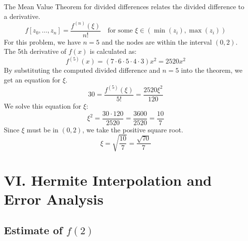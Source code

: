 \documentclass[a4paper]{article}
\begin{document}
The Mean Value Theorem for divided differences relates the divided difference to a derivative.
\[
f[z_0, \dots, z_n] = \frac{f^{(n)}(\xi)}{n!} \quad \text{for some } \xi \in (\min(z_i), \max(z_i))
\]
For this problem, we have $n=5$ and the nodes are within the interval $(0,2)$. The 5th derivative of $f(x)$ is calculated as:
\[
f^{(5)}(x) = (7 \cdot 6 \cdot 5 \cdot 4 \cdot 3) x^2 = 2520x^2
\]
By substituting the computed divided difference and $n=5$ into the theorem, we get an equation for $\xi$.
\[
30 = \frac{f^{(5)}(\xi)}{5!} = \frac{2520\xi^2}{120}
\]
We solve this equation for $\xi$:
\[
\xi^2 = \frac{30 \cdot 120}{2520} = \frac{3600}{2520} = \frac{10}{7}
\]
Since $\xi$ must be in $(0,2)$, we take the positive square root.
\[
\xi = \sqrt{\frac{10}{7}} = \frac{\sqrt{70}}{7}
\]

\section*{VI. Hermite Interpolation and Error Analysis}

\subsection*{Estimate of $f(2)$}
\end{document}
